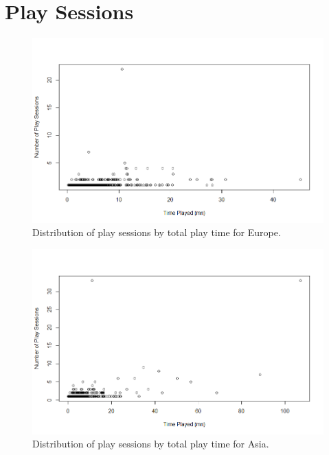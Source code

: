 \documentclass[preprint,authoryear,12pt]{elsarticle}
\begin{document}
\section{Play Sessions}
\begin{figure}[htb]
	\begin{center}
		\includegraphics[width=.8\linewidth]{ijhcs14-img/playsessions_europe}
		\caption{Distribution of play sessions by total play time for Europe.\label{fig:playtime_e}}
	\end{center}
\end{figure}

\begin{figure}[htb]
	\begin{center}
		\includegraphics[width=.8\linewidth]{ijhcs14-img/playsessions_asia}
		\caption{Distribution of play sessions by total play time for Asia.\label{fig:playtime_as}}
	\end{center}
\end{figure}
\end{document}
